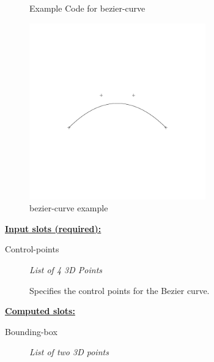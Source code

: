 \documentclass [11pt]{book}
\begin{document}
\begin{itemize}
\begin{figure}
\caption{Example Code for bezier-curve}

\label{fig:example-code-bezier-curve}

\end{figure}

\begin{figure}
\begin{center}
\includegraphics[width=3in,height=3in]{../images/example-bezier-curve.pdf}
\end{center}

\caption{bezier-curve example}

\label{fig:bezier-curve}

\end{figure}





\textbf{
\underline{Input slots (required):}}

\begin{description}

\item [Control-points]
\emph{List of 4 3D Points}

 Specifies the control points for the Bezier curve.




\end{description}






\textbf{
\underline{Computed slots:}}

\begin{description}

\item [Bounding-box]
\emph{List of two 3D points}


\end{description}
\end{itemize}
\end{document}
